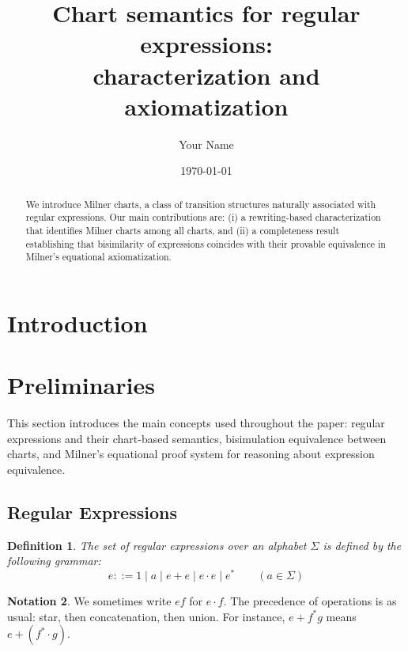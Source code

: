 \documentclass{article}
\newtheorem{definition}{Definition}[section]
\begin{document}
\title{Chart semantics for regular expressions:\\characterization and axiomatization}
\author{Your Name}
\date{\today}
\maketitle  
\begin{abstract}
We introduce Milner charts, a class of transition structures naturally associated with regular expressions. Our main contributions are: (i) a rewriting-based characterization that identifies Milner charts among all charts, and (ii) a completeness result establishing that bisimilarity of expressions coincides with their provable equivalence in Milner's equational axiomatization. 
\end{abstract}
\section{Introduction}

\section{Preliminaries}

This section introduces the main concepts used throughout the paper: regular expressions and their chart-based semantics, bisimulation equivalence between charts, and Milner's equational proof system for reasoning about expression equivalence.

\subsection{Regular Expressions}
\begin{definition}
The set of \emph{regular expressions} over an alphabet $\Sigma$ is defined by the following grammar:
\[
e ::= 1 \mid a \mid e + e \mid e\cdot e \mid e^* \qquad (a \in \Sigma)
\]
\end{definition}

\vspace{1em}
\theoremstyle{definition}
\newtheorem{notation}[definition]{Notation}

\begin{notation} 
We sometimes write $ef$ for $e \cdot f$. The precedence of operations is as usual: star, then concatenation, then union. For instance, $e+f^*g$ means $e+(f^*\cdot g)$.
\end{notation}
\vspace{1em}
\end{document}
